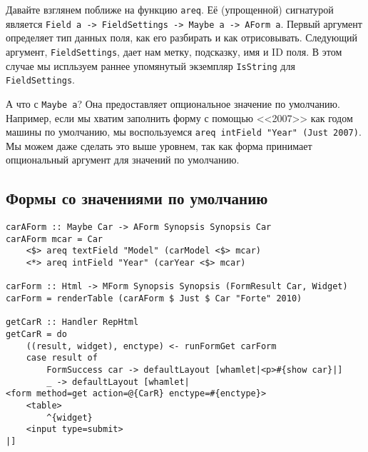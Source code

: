 Давайте взглянем поближе на функцию \lstinline'areq'. Её (упрощенной) сигнатурой является
\lstinline'Field a -> FieldSettings -> Maybe a -> AForm a'. 
Первый аргумент определяет тип данных поля, как его разбирать и как отрисовывать.
Следующий аргумент, \lstinline'FieldSettings', дает нам метку, подсказку, имя и  ID
поля. В этом случае мы испльзуем раннее упомянутый экземпляр \lstinline'IsString' для 
\lstinline'FieldSettings'.

А что с \lstinline'Maybe a'? Она предоставляет опциональное значение по умолчанию. 
Например, если мы хватим заполнить форму с помощью <<2007>> как годом машины по
умолчанию, мы воспользуемся \lstinline'areq intField "Year" (Just 2007)'. Мы можем даже
сделать это выше уровнем, так как форма принимает опциональный аргумент для значений по
умолчанию.

\subsection{Формы со значениями по умолчанию}
\begin{remark}
\begin{lstlisting}
carAForm :: Maybe Car -> AForm Synopsis Synopsis Car
carAForm mcar = Car
    <$> areq textField "Model" (carModel <$> mcar)
    <*> areq intField "Year" (carYear <$> mcar)

carForm :: Html -> MForm Synopsis Synopsis (FormResult Car, Widget)
carForm = renderTable (carAForm $ Just $ Car "Forte" 2010)

getCarR :: Handler RepHtml
getCarR = do
    ((result, widget), enctype) <- runFormGet carForm
    case result of
        FormSuccess car -> defaultLayout [whamlet|<p>#{show car}|]
        _ -> defaultLayout [whamlet|
<form method=get action=@{CarR} enctype=#{enctype}>
    <table>
        ^{widget}
    <input type=submit>
|]
\end{lstlisting}
\end{remark}

